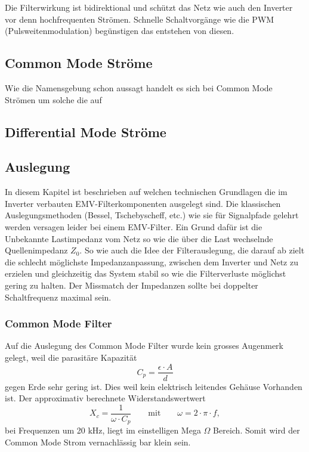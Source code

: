 Die Filterwirkung ist bidirektional und schützt das Netz wie auch den Inverter vor denn hochfrequenten Strömen.
Schnelle Schaltvorgänge wie die PWM (Pulsweitenmodulation) begünstigen das entstehen von diesen. 

\subsection{Common Mode Ströme}
Wie die Namensgebung schon aussagt handelt es sich bei Common Mode Strömen um solche die auf 

\subsection{Differential Mode Ströme}
\label{chapter_diffModSt}

\subsection{Auslegung}
In diesem Kapitel ist beschrieben auf welchen technischen Grundlagen die im Inverter verbauten EMV-Filterkomponenten ausgelegt sind. 
Die klassischen Auslegungsmethoden (Bessel, Tschebyscheff, etc.) wie sie für Signalpfade gelehrt werden versagen leider bei einem EMV-Filter. 
Ein Grund dafür ist die Unbekannte Lastimpedanz vom Netz so wie die über die Last wechselnde Quellenimpedanz $Z_0$.
So wie auch die Idee der Filterauslegung, die darauf ab zielt die schlecht möglichste Impedanzanpassung, zwischen dem Inverter und Netz zu erzielen und gleichzeitig das System stabil so wie die Filterverluste möglichst gering zu halten.
Der Missmatch der Impedanzen sollte bei doppelter Schaltfrequenz maximal sein.
\subsubsection{Common Mode Filter}
Auf die Auslegung des Common Mode Filter wurde kein grosses Augenmerk gelegt, weil die parasitäre Kapazität
\begin{equation}
C_p=\dfrac{\epsilon \cdot A}{d}
\end{equation}
gegen Erde sehr gering ist. 
Dies weil kein elektrisch leitendes Gehäuse Vorhanden ist.
Der approximativ berechnete Widerstandswertwert 
\begin{equation}
X_c=\dfrac{1}{\omega \cdot C_p} \qquad\text{mit}\qquad
\omega = 2\cdot\pi\cdot f,
\end{equation}
bei Frequenzen um 20 kHz, liegt im einstelligen Mega $\Omega$ Bereich.
Somit wird der Common Mode Strom vernachlässig bar klein sein.

